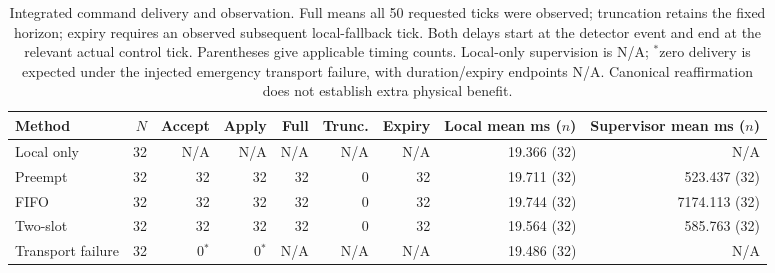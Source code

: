 \begin{table}[htbp]
\centering\small
\setlength{\tabcolsep}{3pt}
\caption{Integrated command delivery and observation. Full means all 50 requested ticks were observed; truncation retains the fixed horizon; expiry requires an observed subsequent local-fallback tick. Both delays start at the detector event and end at the relevant actual control tick. Parentheses give applicable timing counts. Local-only supervision is N/A; $^{*}$zero delivery is expected under the injected emergency transport failure, with duration/expiry endpoints N/A. Canonical reaffirmation does not establish extra physical benefit.}
\label{tab:v3_integrated}
\begin{tabular}{lrrrrrrrr}
\toprule
Method & $N$ & Accept & Apply & Full & Trunc. & Expiry & \shortstack{Local mean\\ms ($n$)} & \shortstack{Supervisor mean\\ms ($n$)} \\
\midrule
Local only & 32 & N/A & N/A & N/A & N/A & N/A & 19.366 (32) & N/A \\
Preempt & 32 & 32 & 32 & 32 & 0 & 32 & 19.711 (32) & 523.437 (32) \\
FIFO & 32 & 32 & 32 & 32 & 0 & 32 & 19.744 (32) & 7174.113 (32) \\
Two-slot & 32 & 32 & 32 & 32 & 0 & 32 & 19.564 (32) & 585.763 (32) \\
Transport failure & 32 & 0$^{*}$ & 0$^{*}$ & N/A & N/A & N/A & 19.486 (32) & N/A \\
\bottomrule
\end{tabular}
\end{table}
